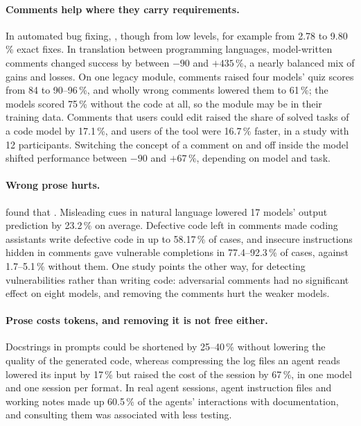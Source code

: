 \paragraph{Comments help where they carry requirements.}
In automated bug fixing, , though
from low levels, for example from 2.78 to 9.80\,\% exact fixes.
In translation between programming languages, model-written comments changed
success by between $-90$ and $+435$\,\%\autocite{gupta2026translation}, a
nearly balanced mix of gains and losses.
On one legacy module, comments raised four models' quiz scores from 84 to
90--96\,\%, and wholly wrong comments lowered them to
61\,\%\autocite{sabetto2025legacy}; the models scored 75\,\% without the code
at all, so the module may be in their training data.
Comments that users could edit raised the share of solved tasks of a code model
by 17.1\,\%, and users of the tool were 16.7\,\% faster, in a study with 12
participants\autocite{di2025mutual}.
Switching the concept of a comment on and off inside the model shifted
performance between $-90$ and $+67$\,\%, depending on model and
task\autocite{imani2026insideout}.

\paragraph{Wrong prose hurts.}
\Textcite{macke2024documentation} found that
.
Misleading cues in natural language lowered 17 models' output prediction by
23.2\,\% on average\autocite{lam2025codecrash}.
Defective code left in comments made coding assistants write defective code in
up to 58.17\,\% of cases\autocite{huang2026commenttraps}, and insecure
instructions hidden in comments gave vulnerable completions in 77.4--92.3\,\%
of cases, against 1.7--5.1\,\% without them\autocite{munir2026hidden}.
One study points the other way, for detecting vulnerabilities rather than
writing code: adversarial comments had no significant effect on eight models,
and removing the comments hurt the weaker models\autocite{%
thornton2026adversarial}.

\paragraph{Prose costs tokens, and removing it is not free either.}
Docstrings in prompts could be shortened by 25--40\,\% without lowering the
quality of the generated code\autocite{yang2026lessismore}, whereas compressing
the log files an agent reads lowered its input by 17\,\% but raised the cost of
the session by 67\,\%, in one model and one session per
format\autocite{ustynov2026beyond}.
In real agent sessions, agent instruction files and working notes made up
60.5\,\% of the agents' interactions with documentation, and consulting them
was associated with less testing\autocite{gao2026agentfriendly}.

